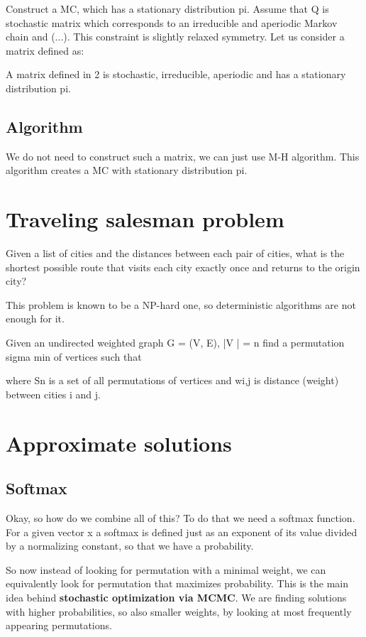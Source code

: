 \documentclass{article}
\begin{document}
		Construct a MC, which has a stationary distribution pi. Assume that Q is stochastic matrix which
		corresponds to an irreducible and aperiodic Markov chain and (...). This constraint is slightly relaxed symmetry. Let us consider a matrix defined as:
		
		A matrix defined in 2 is stochastic, irreducible, aperiodic and has a stationary distribution pi.
		
		\subsection{Algorithm}
			We do not need to construct such a matrix, we can just use M-H algorithm. This algorithm creates a MC with stationary distribution pi.
	
	\section{Traveling salesman problem}
		Given a list of cities and the distances between each pair of cities, what is the shortest possible route that visits each city exactly once and returns to the origin city?
		
		This problem is known to be a NP-hard one, so deterministic algorithms are not enough for it.
		
		Given an undirected weighted graph G = (V, E), |V | = n find a permutation sigma min of vertices such that
		
		where Sn is a set of all permutations of vertices and wi,j is distance (weight) between cities i and j.
		
	\section{Approximate solutions}
		\subsection{Softmax}
			Okay, so how do we combine all of this? To do that we need a softmax function. For a given vector x a softmax is defined just as an exponent of its value divided by a normalizing constant, so that we have a probability.
			
			So now instead of looking for permutation with a minimal weight, we can equivalently look for permutation that maximizes probability. This is the main idea behind \textbf{stochastic optimization via MCMC}. We are finding solutions with higher probabilities, so also smaller weights, by looking at most frequently appearing permutations.
			
\end{document}
